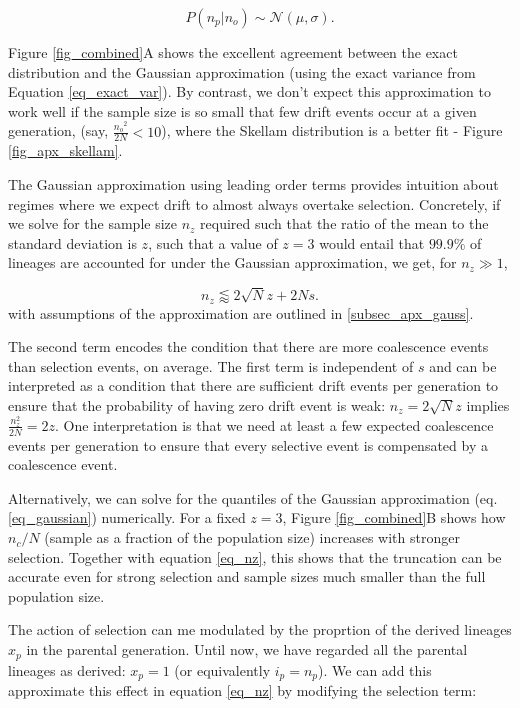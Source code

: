 \documentclass[review]{elsarticle}
\begin{document}
\begin{equation}
  P(n_p|n_o) \sim \mathcal{N}(\mu, \sigma).
  \label{eq_gaussian}
\end{equation}

Figure \ref{fig_combined}A shows the excellent agreement between the exact distribution and the
Gaussian approximation (using the exact variance from Equation \ref{eq_exact_var}). By contrast,
we don't expect this approximation to work well if the sample size is so small that few drift
events occur at a given generation, (say, $\frac{{n_o}^2}{2N} < 10$), where the Skellam
distribution is a better fit - Figure \ref{fig_apx_skellam}.
 
The Gaussian approximation using leading order terms provides intuition about regimes where we
expect drift to almost always overtake selection.  Concretely, if we solve for the sample size
$n_z$ required such that the ratio of the mean to the standard deviation is $z$, such that a value
of $z=3$ would entail that $99.9\%$ of lineages are accounted for under the Gaussian approximation,
we get, for $n_z\gg 1$,

\begin{equation}
  n_z \lessapprox 2 \sqrt{N} z + 2N s.
\label{eq_nz}
\end{equation}
with assumptions of the approximation are outlined in \ref{subsec_apx_gauss}. 

The second term
encodes the condition that there are more coalescence events than selection events, on average. The
first term is independent of $s$ and can be interpreted as a condition that there are sufficient
drift events per generation to ensure that the probability of having zero drift event is weak: $n_z
= 2 \sqrt N z$ implies $\frac{n_z^2}{2N}= 2 z$. One interpretation is that we need at least a few
expected coalescence events per generation to ensure that every selective event is compensated by a
coalescence event. 

Alternatively, we can solve for the quantiles of the Gaussian approximation (eq. \ref{eq_gaussian})
numerically. For a fixed $z=3$, Figure \ref{fig_combined}B shows how $n_c/N$ (sample as a fraction
of the population size) increases with stronger selection. Together with equation \ref{eq_nz}, this shows
that the truncation can be accurate even for strong selection and sample sizes much smaller than
the full population size. 

The action of selection can me modulated by the proprtion of the derived lineages $x_p$ in the
parental generation. Until now, we have regarded all the parental lineages as derived: $x_p=1$ (or
equivalently  $i_p = n_p$). We can add this approximate this effect in equation \eqref{eq_nz} by
modifying the selection term:
\end{document}
